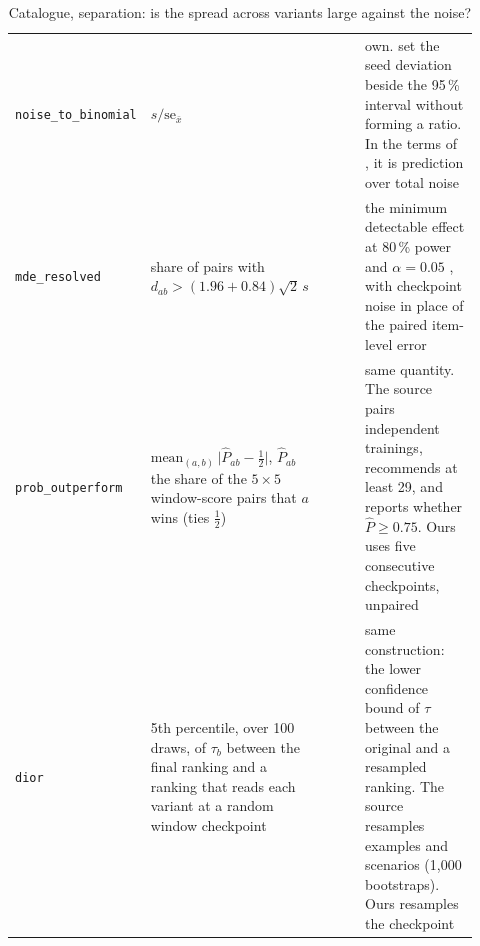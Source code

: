 \begin{table}[h]
\begin{tabular}{@{}p{0.215\linewidth}p{0.28\linewidth}p{0.14\linewidth}p{0.285\linewidth}@{}}
\texttt{noise\_to\_binomial} & $s/\mathrm{se}_{\bar{x}}$ & \citet{madaan_quantifying_2024, wang_measuring_2025} & own. \citet{madaan_quantifying_2024} set the seed deviation beside the 95\,\% interval without forming a ratio. In the terms of \citet{wang_measuring_2025}, it is prediction over total noise \\
\texttt{mde\_resolved} & share of pairs with $d_{ab} > (1.96 + 0.84)\sqrt{2}\,s$ & \citet{card_little_2020, miller_adding_2024} & the minimum detectable effect at 80\,\% power and $\alpha = 0.05$ \citep[Eq.~10]{miller_adding_2024}, with checkpoint noise in place of the paired item-level error \\
\texttt{prob\_outperform} & $\mathrm{mean}_{(a,b)}\,\big|\hat{P}_{ab} - \tfrac12\big|$, $\hat{P}_{ab}$ the share of the $5 \times 5$ window-score pairs that $a$ wins (ties $\tfrac12$) & \citet{bouthillier_accounting_2021} & same quantity. The source pairs independent trainings, recommends at least 29, and reports whether $\hat{P} \geq 0.75$. Ours uses five consecutive checkpoints, unpaired \\
\texttt{dior} & 5th percentile, over 100 draws, of $\tau_b$ between the final ranking and a ranking that reads each variant at a random window checkpoint & \citet{perlitz_efficient_2024} & same construction: the lower confidence bound of $\tau$ between the original and a resampled ranking. The source resamples examples and scenarios (1{,}000 bootstraps). Ours resamples the checkpoint \\
\bottomrule
\end{tabular}
\caption{Catalogue, separation: is the spread across variants large against the noise?}
\label{tab:sur-separation}
\end{table}

